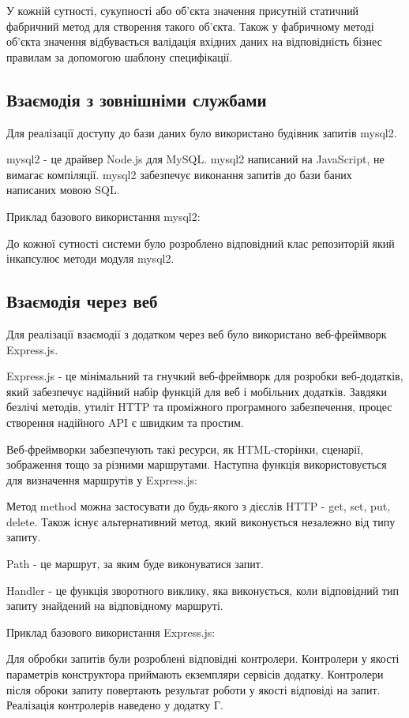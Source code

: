У кожній сутності, сукупності або об'єкта значення присутній статичний фабричний метод для створення такого об'єкта.
Також у фабричному методі об'єкта значення відбувається валідація вхідних даних на відповідність бізнес
правилам за допомогою шаблону специфікації.

\subsection{Взаємодія з зовнішніми службами}

Для реалізації доступу до бази даних було використано будівник запитів mysql2.

mysql2 - це драйвер Node.js для MySQL. mysql2 написаний на JavaScript, не вимагає компіляції.
mysql2 забезпечує виконання запитів до бази баних написаних мовою SQL.

Приклад базового використання mysql2:


До кожної сутності системи було розроблено відповідний клас репозиторій
який інкапсулює методи модуля mysql2.

\subsection{Взаємодія через веб}

Для реалізації взаємодії з додатком через веб було використано веб-фреймворк Express.js.

Express.js - це мінімальний та гнучкий веб-фреймворк для розробки веб-додатків,
який забезпечує надійний набір функцій для веб і мобільних додатків.
Завдяки безлічі методів, утиліт HTTP та проміжного програмного
забезпечення, процес створення надійного API є швидким та простим.

Веб-фреймворки забезпечують такі ресурси, як HTML-сторінки, сценарії,
зображення тощо за різними маршрутами.
Наступна функція використовується для визначення маршрутів у Express.js:


Метод method можна застосувати до будь-якого з дієслів HTTP - get, set, put, delete.
Також існує альтернативний метод, який виконується незалежно від типу запиту.

Path - це маршрут, за яким буде виконуватися запит.

Handler - це функція зворотного виклику, яка виконується,
коли відповідний тип запиту знайдений на відповідному маршруті.

Приклад базового використання Express.js:


Для обробки запитів були розроблені відповідні контролери. Контролери
у якості параметрів конструктора приймають екземпляри сервісів додатку.
Контролери після оброки запиту повертають результат роботи у якості відповіді на запит.
Реалізація контролерів наведено у додатку Г.
